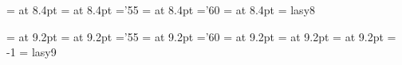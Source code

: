  \font\egtrm  = \textname at 8.4pt    	%
 \font\egtmi  = \mathitname at 8.4pt  	%
    \skewchar\egtmi ='55        	%
 \font\egtsy  = \mathsyname at 8.4pt  	%
    \skewchar\egtsy ='60         	%
 \font\egtit  = \italname at 8.4pt 	%
 \font\egtly  = lasy8           	%

 \font\ninrm  = \textname at 9.2pt  	%
 \font\ninmi  = \mathitname at 9.2pt	%
    \skewchar\ninmi ='55        	%
 \font\ninsy  = \mathsyname at 9.2pt	%
    \skewchar\ninsy ='60         	%
 \font\ninit  = \italname at 9.2pt 	%
 \font\ninbf  = \boldname at 9.2pt   	%
 \font\nintt  = \typename at 9.2pt	%
    \hyphenchar\nintt = -1       	%
 \font\ninly  = lasy9           	%

